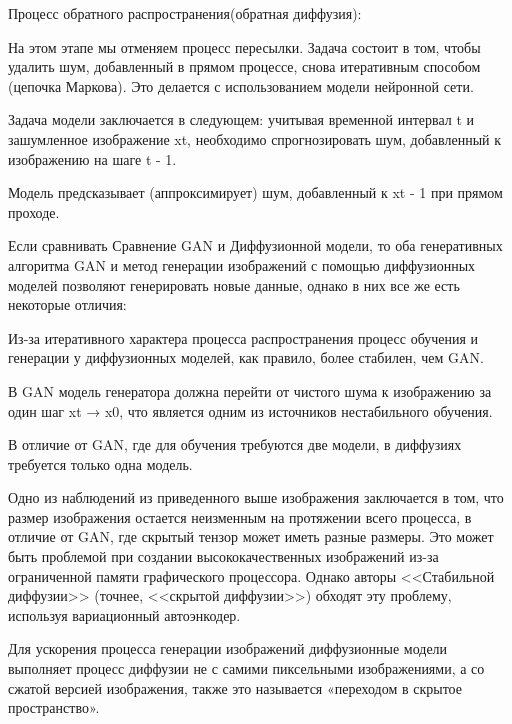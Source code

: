 Процесс обратного распространения(обратная диффузия):

\begin{enumerate_num}
    \item  На этом этапе мы отменяем процесс пересылки. Задача состоит в том, чтобы удалить шум, добавленный в прямом процессе, снова итеративным способом (цепочка Маркова). Это делается с использованием модели нейронной сети.
    \item Задача модели заключается в следующем: учитывая временной интервал t и зашумленное изображение xt, необходимо спрогнозировать шум, добавленный к изображению на шаге t - 1.
    \item Модель предсказывает (аппроксимирует) шум, добавленный к xt - 1 при прямом проходе.
\end{enumerate_num}

Если сравнивать Сравнение GAN и Диффузионной модели, то оба генеративных алгоритма GAN и метод генерации изображений с помощью диффузионных моделей позволяют генерировать новые данные, однако в них все же есть некоторые отличия:

\begin{enumerate_num}
    \item  Из-за итеративного характера процесса распространения процесс обучения и генерации у диффузионных моделей, как правило, более стабилен, чем GAN.
    \item В GAN модель генератора должна перейти от чистого шума к изображению за один шаг xt → x0, что является одним из источников нестабильного обучения.
    \item В отличие от GAN, где для обучения требуются две модели, в диффузиях требуется только одна модель.
\end{enumerate_num}

Одно из наблюдений из приведенного выше изображения заключается в том, что размер изображения остается неизменным на протяжении всего процесса, в отличие от GAN, где скрытый тензор может иметь разные размеры. Это может быть проблемой при создании высококачественных изображений из-за ограниченной памяти графического процессора. Однако авторы <<Стабильной диффузии>> (точнее, <<скрытой диффузии>>) обходят эту проблему, используя вариационный автоэнкодер.

Для ускорения процесса генерации изображений  диффузионные модели выполняет процесс диффузии не с самими пиксельными изображениями, а со сжатой версией изображения, также это называется «переходом в скрытое пространство».

